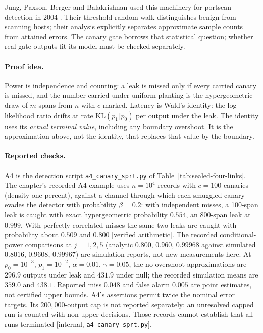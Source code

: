 \documentclass[11pt,a4paper]{article}
\theoremstyle{definition}
\begin{document}
Jung, Paxson, Berger and Balakrishnan used this machinery for portscan
detection in 2004 . Their threshold random walk distinguishes
benign from scanning hosts; their analysis explicitly separates approximate
sample counts from attained errors. The canary gate borrows that statistical
question; whether real gate outputs fit its model must be checked
separately.

\paragraph{Proof idea.}
Power%
\space is independence and counting: a leak is missed only if every carried
canary is missed, and the number carried under uniform planting is the
hypergeometric draw of $m$ spans from $n$ with $c$ marked. Latency is Wald's
identity: the log-likelihood ratio drifts at rate $\mathrm{KL}(p_1\Vert p_0)$
per output under the leak. The identity uses its \emph{actual terminal value},
including any boundary overshoot. It is the approximation above, not the
identity, that replaces that value by the boundary.

\paragraph{Reported checks.}
A4 is the detection script \texttt{a4\_canary\_sprt.py} of
Table~\ref{tab:sealed-four-links}.
The chapter's recorded A4 example uses $n=10^4$ records with $c=100$ canaries (density
one percent), against a channel through which each smuggled canary evades the
detector with probability $\beta=0.2$: with independent misses, a 100-span
leak is caught with exact hypergeometric probability $0.554$, an 800-span
leak at $0.999$. With perfectly correlated misses the same two leaks are
caught with probability about $0.509$ and $0.800$ [verified arithmetic]. The recorded conditional-power comparisons at
$j=1,2,5$ (analytic $0.800$, $0.960$, $0.99968$ against simulated $0.8016$,
$0.9608$, $0.99967$) are simulation reports, not new measurements here.
At $p_0=10^{-3}$, $p_1=10^{-2}$, $\alpha=0.01$, $\gamma=0.05$, the
no-overshoot approximations are $296.9$ outputs under leak and $431.9$ under
null; the recorded simulation means are $359.0$ and $438.1$. Reported miss
$0.048$ and false alarm $0.005$ are point estimates, not certified upper
bounds. A4's assertions permit twice the nominal error targets. Its
$200{,}000$-output cap is not reported separately: an unresolved capped run
is counted with non-upper decisions. Those records cannot establish that all
runs terminated [internal, \texttt{a4\_canary\_sprt.py}].
\end{document}
